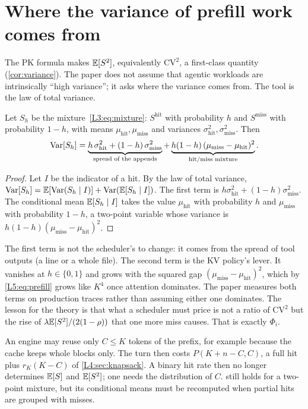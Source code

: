 \section{Where the variance of prefill work comes from}\label{L5:sec:variance}

The PK formula makes $\mathbb{E}[S^2]$, equivalently $\mathrm{CV}^2$, a first-class
quantity (\cref{cor:variance}). The paper does not assume that agentic
workloads are intrinsically ``high variance''; it asks where the variance
comes from. The tool is the law of total variance.

\begin{lemma}\label{L5:lem:split}
Let $S_h$ be the mixture~\eqref{L3:eq:mixture}: $S^{\mathrm{hit}}$ with
probability $h$ and $S^{\mathrm{miss}}$ with probability $1-h$, with means
$\mu_{\mathrm{hit}},\mu_{\mathrm{miss}}$ and variances
$\sigma^2_{\mathrm{hit}},\sigma^2_{\mathrm{miss}}$. Then
\[
  \operatorname{Var}[S_h]=\underbrace{h\,\sigma^2_{\mathrm{hit}}+(1-h)\,\sigma^2_{\mathrm{miss}}}_{\text{spread of the appends}}
  +\underbrace{h(1-h)\,(\mu_{\mathrm{miss}}-\mu_{\mathrm{hit}})^2}_{\text{hit/miss mixture}} .
\]
\end{lemma}

\begin{proof}
Let $I$ be the indicator of a hit. By the law of total variance,
$\operatorname{Var}[S_h]=\mathbb{E}[\operatorname{Var}(S_h\mid I)]+\operatorname{Var}(\mathbb{E}[S_h\mid I])$. The first term is
$h\sigma^2_{\mathrm{hit}}+(1-h)\sigma^2_{\mathrm{miss}}$. The conditional
mean $\mathbb{E}[S_h\mid I]$ takes the value $\mu_{\mathrm{hit}}$ with probability
$h$ and $\mu_{\mathrm{miss}}$ with probability $1-h$, a two-point
variable whose variance is $h(1-h)(\mu_{\mathrm{miss}}-\mu_{\mathrm{hit}})^2$.
\end{proof}

The first term is not the scheduler's to change: it comes from the spread
of tool outputs (a line or a whole file). The second term is the KV
policy's lever. It vanishes at $h\in\{0,1\}$ and grows with the squared gap
$(\mu_{\mathrm{miss}}-\mu_{\mathrm{hit}})^2$, which by \eqref{L5:eq:prefill}
grows like $K^4$ once attention dominates. The paper measures both terms
on production traces rather than assuming either one dominates. The lesson
for the theory is that what a scheduler must price is not a ratio of
$\mathrm{CV}^2$ but the rise of $\lambda\mathbb{E}[S^2]/(2(1-\rho))$ that one
more miss causes. That is exactly $\Phi_i$.

\begin{remark}\label{L5:rem:partial}
An engine may reuse only $C\le K$ tokens of the prefix, for example because the cache
keeps whole blocks only. The turn then costs $P(K+n-C,C)$, a full hit plus
$r_K(K-C)$ of \cref{L4:sec:knapsack}. A binary hit rate then no longer determines
$\mathbb{E}[S]$ and $\mathbb{E}[S^2]$; one needs the distribution of $C$.  still
holds for a two-point mixture, but its conditional means must be recomputed when
partial hits are grouped with misses.
\end{remark}


